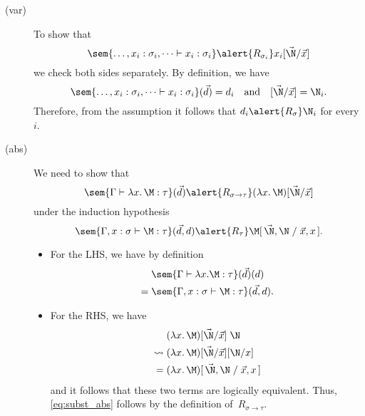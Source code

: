 \begin{frame}
  \begin{description}
    \item[(var)] To show that
      \[
        \sem{\dots, x_i : \sigma_i, \dots \vdash x_i : \sigma_i}
        \alert{\mathrel{R_{\sigma_i}}}
        x_i[\vec{\N}/\vec{x}]
      \]
      we check both sides separately.
      By definition, we have
      \[
        \sem{\dots, x_i : \sigma_i, \dots \vdash x_i : \sigma_i}(\vec{d})
        = d_i
        \quad\text{and}\quad
        [\vec{\N}/\vec{x}] = \N_i.  
      \]
      Therefore, from the assumption it follows
      that $d_i \alert{\mathrel{R_{\sigma}}} \N_i$ for every~$i$.
  \end{description}
\end{frame}
\begin{frame}
  \begin{description}
    \item[(abs)] We need to show that
      \begin{equation}
        \label{eq:subst_abs}
        \sem{\Gamma\vdash\lambda x.\,\M : \tau} (\vec{d})
        \alert{\mathrel{R_{\sigma\to\tau}}}
          (\lambda x.\, \M)[\vec{\N}/\vec{x}]
      \end{equation}
      under the induction hypothesis
      \[\sem{\Gamma, x : \sigma \vdash \M : \tau} (\vec{d}, d)
        \alert{\mathrel{R_{\tau}}}
          \M[\,\vec{\N}, \N\mathrel{/}\vec{x}, x\,].
      \]
      \begin{itemize}
        \item For the LHS, we have by definition
          \begin{align*}
            & \sem{\Gamma \vdash \lambda x.\M : \tau}(\vec{d})(d) \\
            ={}& \sem{\Gamma, x : \sigma \vdash \M : \tau}(\vec{d}, d).
          \end{align*}
        \item For the RHS, we have
          \begin{align*}
            & (\lambda x.\,\M)[\vec{\N}/\vec{x}]\;\N \\
            \leadsto{} & (\lambda x.\,\M)[\vec{\N}/\vec{x}][\N/x] \\
            ={} & (\lambda x.\,\M)[\, \vec{\N}, \N \mathrel{/} \vec{x}, x\,]
          \end{align*}
          and it follows that these two terms are logically equivalent. 
          Thus, \eqref{eq:subst_abs} follows by
          the definition of~$\mathrel{R_{\sigma\to\tau}}$.
      \end{itemize}
  \end{description}

\end{frame}

